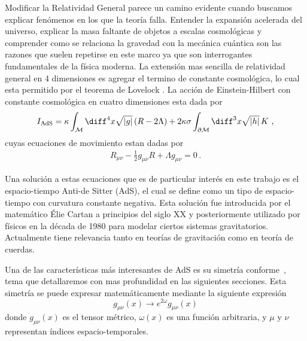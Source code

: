 \documentclass[../Main.tex]{subfiles}
\begin{document}
Modificar la Relatividad General parece un camino evidente cuando buscamos explicar fenómenos en los que la teoría falla. Entender la expansión acelerada del universo, explicar la masa faltante de objetos a escalas cosmológicas y comprender como se relaciona la gravedad con la mecánica cuántica son las razones que suelen repetirse en este marco ya que son interrogantes fundamentales de la física moderna. La extensión mas sencilla de relatividad general en 4 dimensiones es agregar el termino de constante cosmológica, lo cual esta permitido por el teorema de Lovelock \cite{Lovelock:1971yv}. La acción de Einstein-Hilbert con constante cosmológica en cuatro dimensiones esta dada por
\begin{equation}
    I_{\text{AdS}}=\kappa \int_{\mathcal{M}} \diff^{4}x \sqrt{\lvert g\rvert}\, (R-2\Lambda) + 2 \kappa\sigma\int_{\partial\mathcal{M}} \diff^{3}x \sqrt{\lvert h\rvert}\, K\, \, ,\label{ehconl}
\end{equation}
cuyas ecuaciones de movimiento estan dadas por 
\begin{align}
R_{\mu\nu}-\frac{1}{2}g_{\mu\nu}R+\Lambda g_{\mu\nu} =0\, . \label{econlambda}
\end{align}

 Una solución a estas ecuaciones que es de particular interés en este trabajo es el espacio-tiempo Anti-de Sitter (AdS), el cual se define como un tipo de espacio-tiempo con curvatura constante negativa. Esta solución fue introducida por el matemático Élie Cartan a principios del siglo XX y posteriormente utilizado por físicos en la década de 1980 para modelar ciertos sistemas gravitatorios. Actualmente tiene relevancia tanto en teorías de gravitación como en teoría de cuerdas.

Una de las características más interesantes de AdS es su simetría conforme~\cite{balasubramanian1999stress}, tema que detallaremos con mas profundidad en las siguientes secciones. Esta simetría se puede expresar matemáticamente mediante la siguiente expresión 
\begin{equation}
g_{\mu\nu}(x) \rightarrow e^{2\omega}g_{\mu\nu}(x)
\end{equation}
donde $g_{\mu\nu}(x)$ es el tensor métrico, $\omega(x)$ es una función arbitraria, y $\mu$ y $\nu$ representan índices espacio-temporales.
\end{document}
